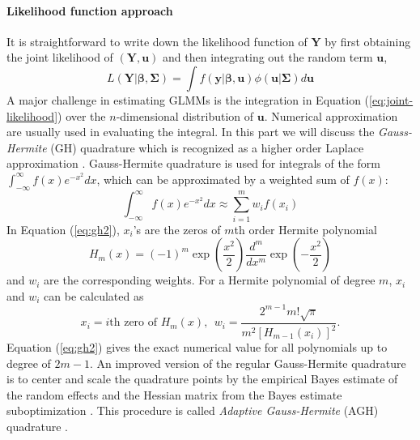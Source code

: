 \paragraph{Likelihood function approach}\label{para:likelihood-approach}
It is straightforward  to write down the likelihood function of $\bm Y$ by first obtaining the
joint likelihood of $(\bm Y, \bm u)$ and then integrating out the random term $\bm u$,
\begin{equation}\label{eq:joint-likelihood}
L(\bm Y|\bm\beta, \bm \Sigma) = \int f(\bm y|\bm \beta, \bm u)\phi(\bm u|\bm \Sigma)d \bm u
\end{equation}
A major challenge in estimating GLMMs is the integration in Equation (\ref{eq:joint-likelihood})
over the $n$-dimensional distribution of $\bm u$. Numerical approximation are usually used in
evaluating the integral. In this part we will discuss the \textit{Gauss-Hermite} (GH) quadrature
which is recognized as a higher order Laplace approximation \citep{liu1994note}.
Gauss-Hermite quadrature is used for integrals of the form 
$\int_{-\infty}^{\infty}f(x) e^{-x^2}dx$, which can be approximated by a weighted sum of  $f(x)$:
\begin{equation}\label{eq:gh2}
\int_{-\infty}^{\infty}f(x) e^{-x^2}dx \approx \sum_{i=1}^m w_if(x_i)
\end{equation}
In Equation (\ref{eq:gh2}), $x_i$'s are the zeros of $m$th order Hermite polynomial 
\[H_m(x) = (-1)^m\exp(\dfrac{x^2}{2})\frac{d^m}{dx^m}\exp(-\dfrac{x^2}{2})\]
and $w_i$ are the corresponding weights. For a Hermite polynomial of degree $m$, $x_i$ and $w_i$
can be calculated as 	
\begin{equation}\label{eq:gh3}
x_i = i\text{th zero of } H_m(x),~~  w_i = \frac{2^{m-1}m!\sqrt{\pi}}{m^2[H_{m-1}(x_i)]^2}. 
\end{equation}
Equation (\ref{eq:gh2}) gives the exact numerical value for all polynomials up to degree of
$2m-1$. 
An improved version of the regular Gauss-Hermite quadrature is to center and scale the quadrature
points  by the empirical Bayes estimate of the random effects and the Hessian matrix from the Bayes
estimate suboptimization \citep{liu1994note}. This procedure is called \textit{Adaptive
	Gauss-Hermite} (AGH) quadrature \citep{pinheiro1995approximations}. %

